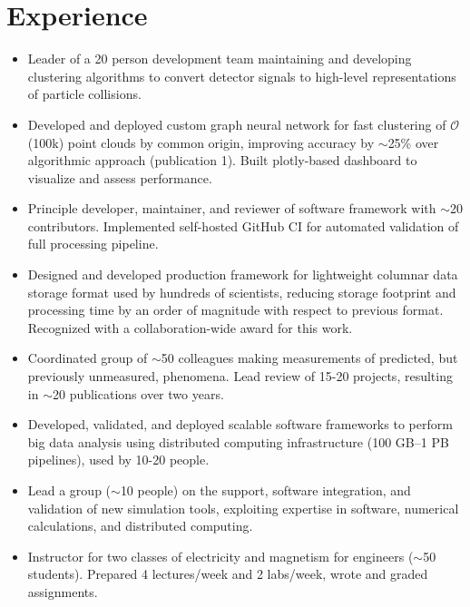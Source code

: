 \documentclass[9pt,a4paper]{moderncv}
\begin{document}
\section{Experience}
{
\begin{itemize}
    \item Leader of a 20 person development team maintaining and developing clustering algorithms to convert detector signals to high-level representations of particle collisions.
    \item Developed and deployed custom graph neural network for fast clustering of $\mathcal{O}$(100k) point clouds by common origin,
        improving accuracy by $\sim$25\% over algorithmic approach (publication 1). Built plotly-based dashboard to visualize and assess performance.
    \item Principle developer, maintainer, and reviewer of software framework with $\sim$20 contributors. Implemented self-hosted GitHub CI for automated validation of full processing pipeline.
    \item Designed and developed production framework for lightweight columnar data storage format used by hundreds of scientists, reducing storage footprint and processing time by an order of magnitude with respect to previous format. Recognized with a collaboration-wide award for this work.
    \item Coordinated group of $\sim$50 colleagues making measurements of predicted, but previously unmeasured, phenomena. Lead review of 15-20 projects, resulting in $\sim$20 publications over two years.
\end{itemize}
}

{
\begin{itemize}
    \item Developed, validated, and deployed scalable software frameworks to perform big data analysis using
distributed computing infrastructure (100 GB--1 PB pipelines), used by 10-20 people.
    \item Lead a group ($\sim$10 people) on the support, software integration, and validation of new simulation tools, exploiting expertise in software, numerical calculations, and distributed computing.
    \item Instructor for two classes of electricity and magnetism for engineers ($\sim$50 students). Prepared 4 lectures/week and 2 labs/week, wrote and graded assignments.
\end{itemize}
}
\end{document}
